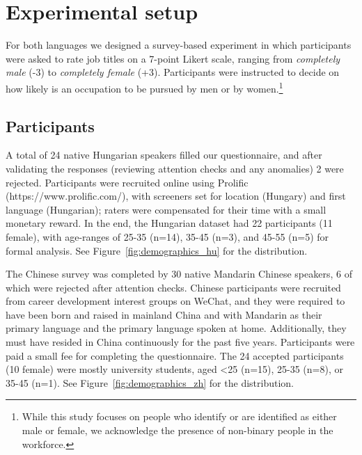 \documentclass[11pt]{article}
\begin{document}
\section{Experimental setup}\label{sec:experiment_setup}

For both languages we designed a survey-based experiment in which participants were asked to rate job titles on a 7-point Likert scale, ranging from \textit{completely male} (-3) to \textit{completely female} (+3). Participants were instructed to decide on how likely is an occupation to be pursued by men or by women.\footnote{While this study focuses on people who identify or are identified as either male or female, we acknowledge the presence of non-binary people in the workforce.}

\subsection{Participants}


A total of 24 native Hungarian speakers filled our questionnaire, and after validating the responses (reviewing attention checks and any anomalies) 2 were rejected. Participants were recruited online using Prolific (https://www.prolific.com/), with screeners set for location (Hungary) and first language (Hungarian); raters were compensated for their time with a small monetary reward. In the end, the Hungarian dataset had 22 participants (11 female), with age-ranges of 25-35 (n=14), 35-45 (n=3), and 45-55 (n=5) for formal analysis. See Figure~\ref{fig:demographics_hu} for the distribution.


The Chinese survey was completed by 30 native Mandarin Chinese speakers, 6 of which were rejected after attention checks. Chinese participants were recruited from career development interest groups on WeChat, and they were required to have been born and raised in mainland China and with Mandarin as their primary language and the primary language spoken at home. Additionally, they must have resided in China continuously for the past five years. Participants were paid a small fee for completing the questionnaire. The 24 accepted participants (10 female) were mostly university students, aged <25 (n=15), 25-35 (n=8), or 35-45 (n=1). See Figure~\ref{fig:demographics_zh} for the distribution.
\end{document}
